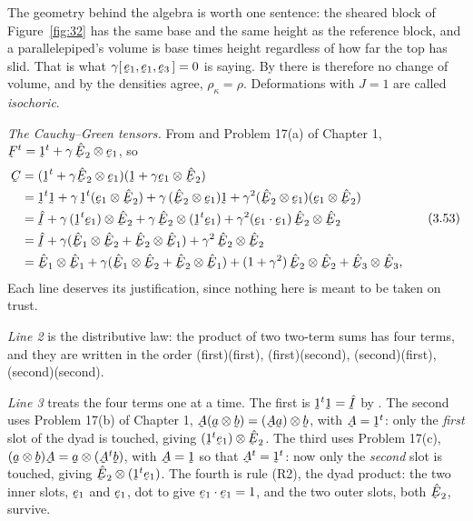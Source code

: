 The geometry behind the algebra is worth one sentence: the sheared block of
Figure~\ref{fig:32} has the same base and the same height as the reference
block, and a parallelepiped's volume is base times height regardless of how
far the top has slid. That is what $\gamma\tbox{\be_{1}}{\be_{1}}{\be_{3}}
=0$ is saying. By  there is therefore no change of volume, and by
 the densities agree, $\rho_{\kappa}=\rho$. Deformations with $J=1$
are called \emph{isochoric}.

\smallskip
\noindent\emph{The Cauchy--Green tensors.} From  and Problem 17(a)
of Chapter 1,
$\bF^{t}=\shift^{t}+\gamma\,\hbE_{2}\otimes\be_{1}$, so
\begin{equation}
\begin{aligned}
   \bC&=(\shift^{t}+\gamma\hbE_{2}\otimes\be_{1})
        (\shift+\gamma\be_{1}\otimes\hbE_{2})\\
   &=\shift^{t}\shift
     +\gamma\,\shift^{t}(\be_{1}\otimes\hbE_{2})
     +\gamma\,(\hbE_{2}\otimes\be_{1})\shift
     +\gamma^{2}(\hbE_{2}\otimes\be_{1})(\be_{1}\otimes\hbE_{2})\\
   &=\hI+\gamma\,(\shift^{t}\be_{1})\otimes\hbE_{2}
     +\gamma\,\hbE_{2}\otimes(\shift^{t}\be_{1})
     +\gamma^{2}(\ip{\be_{1}}{\be_{1}})\,\hbE_{2}\otimes\hbE_{2}\\
   &=\hI+\gamma(\hbE_{1}\otimes\hbE_{2}+\hbE_{2}\otimes\hbE_{1})
     +\gamma^{2}\,\hbE_{2}\otimes\hbE_{2}\\
   &=\hbE_{1}\otimes\hbE_{1}
     +\gamma(\hbE_{1}\otimes\hbE_{2}+\hbE_{2}\otimes\hbE_{1})
     +(1+\gamma^{2})\,\hbE_{2}\otimes\hbE_{2}
     +\hbE_{3}\otimes\hbE_{3},
\end{aligned}
   \tag{3.53}\label{eq:3.53}
\end{equation}
Each line deserves its justification, since nothing here is meant to be
taken on trust.

\emph{Line 2} is the distributive law: the product of two two-term sums has
four terms, and they are written in the order (first)(first),
(first)(second), (second)(first), (second)(second).

\emph{Line 3} treats the four terms one at a time.
The first is $\shift^{t}\shift=\hI$ by .
The second uses Problem 17(b) of Chapter 1,
$\bA(\ba\otimes\bb)=(\bA\ba)\otimes\bb$, with $\bA=\shift^{t}$: only the
\emph{first} slot of the dyad is touched, giving
$(\shift^{t}\be_{1})\otimes\hbE_{2}$.
The third uses Problem 17(c), $(\ba\otimes\bb)\bA=\ba\otimes(\bA^{t}\bb)$,
with $\bA=\shift$ so that $\bA^{t}=\shift^{t}$: now only the \emph{second}
slot is touched, giving $\hbE_{2}\otimes(\shift^{t}\be_{1})$.
The fourth is rule (R2), the dyad product: the two inner slots, $\be_{1}$
and $\be_{1}$, dot to give $\ip{\be_{1}}{\be_{1}}=1$, and the two outer
slots, both $\hbE_{2}$, survive.

